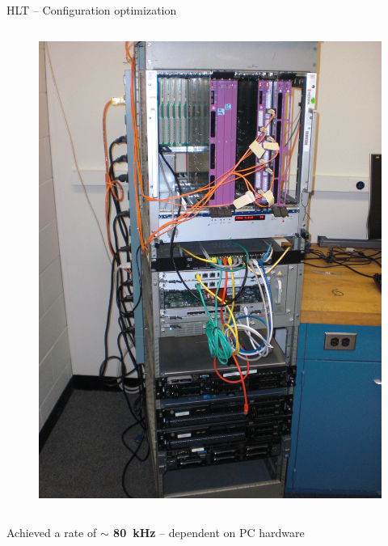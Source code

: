\documentclass[10pt]{beamer}
\begin{document}
\begin{frame}{HLT -- Configuration optimization}
\begin{columns}
\begin{column}{0.45\linewidth}
\begin{figure}
\includegraphics[width=\linewidth]{figures/ANL_RoIB-Teststand.jpg}
\end{figure}
	\end{column}
\end{columns}
Achieved a rate of {\bf$\sim$ 80~kHz} -- dependent on PC hardware 
\end{frame}
\end{document}
